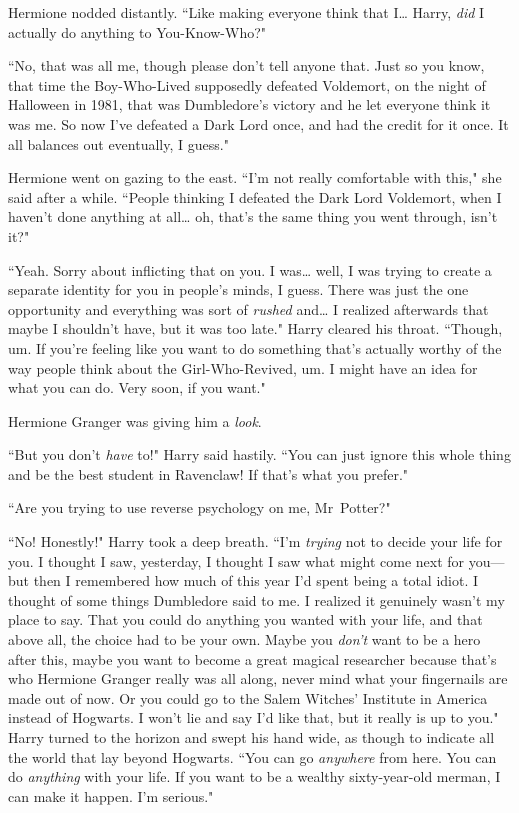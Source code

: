 Hermione nodded distantly. ``Like making everyone think that I{\ldots} Harry, \emph{did} I actually do anything to You-Know-Who?"

``No, that was all me, though please don't tell anyone that. Just so you know, that time the Boy-Who-Lived supposedly defeated Voldemort, on the night of Halloween in 1981, that was Dumbledore's victory and he let everyone think it was me. So now I've defeated a Dark Lord once, and had the credit for it once. It all balances out eventually, I guess."

Hermione went on gazing to the east. ``I'm not really comfortable with this," she said after a while. ``People thinking I defeated the Dark Lord Voldemort, when I haven't done anything at all{\ldots} oh, that's the same thing you went through, isn't it?"

``Yeah. Sorry about inflicting that on you. I was{\ldots} well, I was trying to create a separate identity for you in people's minds, I guess. There was just the one opportunity and everything was sort of \emph{rushed} and{\ldots} I realized afterwards that maybe I shouldn't have, but it was too late." Harry cleared his throat. ``Though, um. If you're feeling like you want to do something that's actually worthy of the way people think about the Girl-Who-Revived, um. I might have an idea for what you can do. Very soon, if you want."

Hermione Granger was giving him a \emph{look}.

``But you don't \emph{have} to!" Harry said hastily. ``You can just ignore this whole thing and be the best student in Ravenclaw! If that's what you prefer."

``Are you trying to use reverse psychology on me, Mr~Potter?"

``No! Honestly!" Harry took a deep breath. ``I'm \emph{trying} not to decide your life for you. I thought I saw, yesterday, I thought I saw what might come next for you—but then I remembered how much of this year I'd spent being a total idiot. I thought of some things Dumbledore said to me. I realized it genuinely wasn't my place to say. That you could do anything you wanted with your life, and that above all, the choice had to be your own. Maybe you \emph{don't} want to be a hero after this, maybe you want to become a great magical researcher because that's who Hermione Granger really was all along, never mind what your fingernails are made out of now. Or you could go to the Salem Witches' Institute in America instead of Hogwarts. I won't lie and say I'd like that, but it really is up to you." Harry turned to the horizon and swept his hand wide, as though to indicate all the world that lay beyond Hogwarts. ``You can go \emph{anywhere} from here. You can do \emph{anything} with your life. If you want to be a wealthy sixty-year-old merman, I can make it happen. I'm serious."

